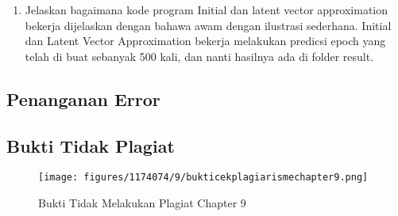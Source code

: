 \begin{enumerate}
		

        	\item Jelaskan bagaimana kode program Initial dan latent vector approximation bekerja dijelaskan dengan bahawa awam dengan ilustrasi sederhana.
Initial dan Latent Vector Approximation bekerja melakukan predicsi epoch yang telah di buat sebanyak 500 kali, dan nanti hasilnya ada di folder result.

		


\end{enumerate}

\subsection{Penanganan Error}

\subsection{Bukti Tidak Plagiat}
\begin{figure}[H]
\centering
	\texttt{[image: figures/1174074/9/bukticekplagiarismechapter9.png]}
	\caption{Bukti Tidak Melakukan Plagiat Chapter 9}
\end{figure}